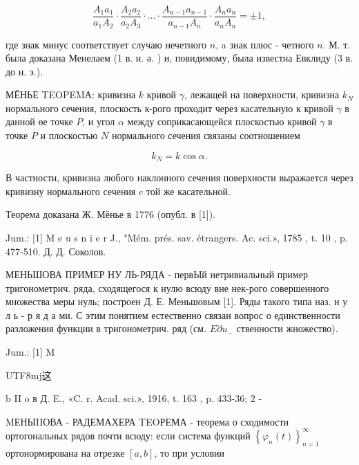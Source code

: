 \documentclass[10pt]{article}
\begin{document}
\[

\frac{A_{1} a_{1}}{a_{1} A_{2}} \cdot \frac{A_{2} a_{2}}{a_{2} A_{3}} \cdot \ldots \cdot \frac{A_{n-1} a_{n-1}}{a_{n-1} A_{n}} \cdot \frac{A_{n} a_{n}}{a_{n} A_{n}}= \pm 1,

\]



где знак минус соответствует случаю нечетного $n$, a знак плюс - четного $n$. М. т. была доказана Менелаем (1 в. н. ә. ) и, повидимому, была известна Евклиду (3 в. до н. э.).



МЁНЬЕ TEOPEMА: кривизна $k$ кривой $\gamma$, лежащей на поверхности, кривизна $k_{N}$ нормального сечения, плоскость к-рого проходит через касательную к кривой $\gamma$ в данной өе точке $P$, и угол $\alpha$ между соприкасающейся плоскостью кривой $\gamma$ в точке $P$ и плоскостью $N$ нормального сечения связаны соотношением



\[

k_{N}=k \cos \alpha .

\]



В частности, кривизна любого наклонного сечения поверхности выражается через кривизну нормального сечения $c$ той же касательной.



Теорема доказана Ж. Мёнье в 1776 (опубл. в [1]).



Jum.: [1] M e u s n i e r J., "Mém. prés. sav. étrangers. Ac. sci.», 1785 , t. 10 , p. 477-510. Д. Д. Соколов.



МЕНЬШОВА ПРИМЕР НУ ЛЬ-РЯДА - первЫй нетривиальный пример тригонометрич. ряда, сходящегося к нулю всюду вне нек-рого совершенного множества меры нуль; построен Д. Е. Меньшовым [1]. Ряды такого типа наз. н у л ь - р я д а ми. С этим понятием естественно связан вопрос о единственности разложения функции в тригонометрич. ряд (см. $E \partial u_{-}$ ственности жножество).



Jum.: [1] M \begin{CJK}{UTF8}{mj}这\end{CJK} b II o в Д. E., «C. r. Acad. sci.», 1916, t. 163 , p. 433-36; 2 -



MЕНЫIIОВА - РАДЕМАХЕРА TEOРЕМА - теорема о сходимости ортогональных рядов почти всюду: если система функций $\left\{\varphi_{n}(t)\right\}_{n=1}^{\infty}$ ортонормирована на отрезке $[a, b]$, то при условии
\end{document}
